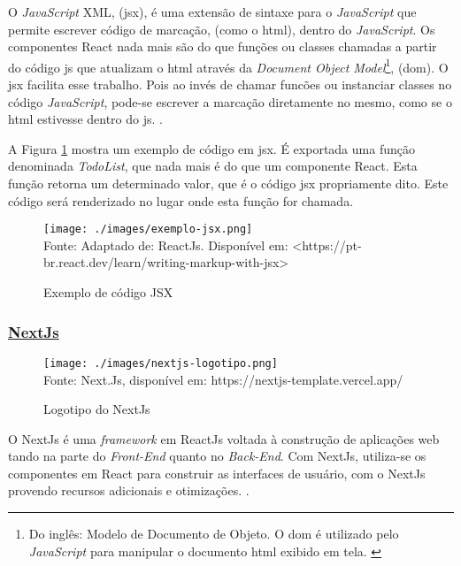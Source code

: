
O \textit{JavaScript} XML, (\acrshort{jsx}),
é uma extensão de sintaxe para o \textit{JavaScript} que permite escrever
código de marcação, (como o \acrshort{html}),
dentro do \textit{JavaScript}. Os componentes React nada mais são do que
funções ou classes chamadas a partir do código
\acrshort{js}
que atualizam o
\acrshort{html}
através da
\textit{Document Object Model}\footnote{Do inglês: Modelo de Documento de Objeto. O
    \acrshort{dom}
    é utilizado pelo \textit{JavaScript} para manipular o documento
    \acrshort{html}
    exibido em tela.
    \cite{alura-dom}
 },
(\acrshort{dom}).
O
\acrshort{jsx}
facilita esse trabalho. Pois ao invés de chamar
funcões ou instanciar classes no código \textit{JavaScript},
pode-se escrever a marcação diretamente no mesmo,
como se o 
\acrshort{html}
estivesse dentro do
\acrshort{js}.
\cite{react-jsx}.

A
Figura \ref{fig:exemplo-jsx}
mostra um exemplo de código em
\acrshort{jsx}.
É exportada uma função denominada \textit{TodoList},
que nada mais é do que um componente React.
Esta função retorna um determinado valor, que é
o código
\acrshort{jsx}
propriamente dito. Este código será renderizado
no lugar onde esta função for chamada.

\begin{figure}[H]
    \centering
    \caption{Exemplo de código JSX}
    \texttt{[image: ./images/exemplo-jsx.png]}
    \label{fig:exemplo-jsx} \\
    \textnormal{\fontsize{10pt}{12pt}Fonte: Adaptado de: ReactJs. Disponível em: <https://pt-br.react.dev/learn/writing-markup-with-jsx>}
\end{figure}

\subsubsection{\underline{NextJs}}

\begin{figure}[H]
    \centering
    \caption{Logotipo do NextJs}
    \texttt{[image: ./images/nextjs-logotipo.png]}
    \label{fig:nextjs-logotipo} \\
    \textnormal{\fontsize{10pt}{12pt}Fonte: Next.Js, disponível em: https://nextjs-template.vercel.app/}
\end{figure}

O NextJs é uma \textit{framework} em ReactJs voltada à construção de aplicações
\acrshort{web}
tando na parte do \textit{Front-End} quanto no \textit{Back-End}.
Com NextJs, utiliza-se os componentes em React para construir as interfaces
de usuário, com o NextJs provendo recursos adicionais e otimizações.
\cite{nexjs-docs}.


